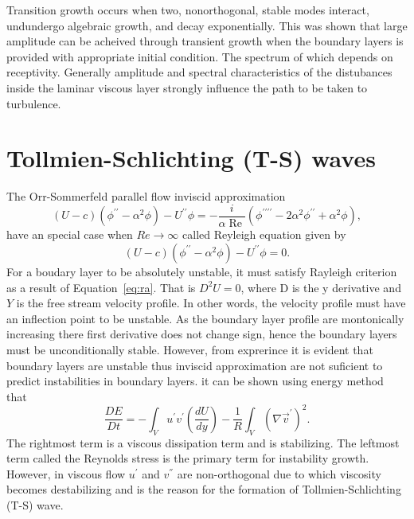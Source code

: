 \documentclass[twoside]{iitbreport}
\newcommand{\Eqref}[1]{Equation~\eqref{eq:#1}}
\begin{document}
Transition growth occurs when two, nonorthogonal, stable modes interact,
undundergo algebraic growth, and decay exponentially. This was shown that
large amplitude can be acheived through transient growth when the boundary
layers is provided with appropriate initial condition. The spectrum of
which depends on receptivity. Generally amplitude and spectral
characteristics of the distubances inside the laminar viscous layer
strongly influence the path to be taken to turbulence.

\section{Tollmien-Schlichting (T-S) waves}

The Orr-Sommerfeld parallel flow inviscid approximation
\begin{equation}
  (U-c)\left(\phi^{\prime \prime}-\alpha^{2} \phi\right)-U^{\prime \prime}
  \phi=-\frac{i}{\alpha \operatorname{Re}}\left(\phi^{\prime \prime \prime
  \prime}-2 \alpha^{2} \phi^{\prime \prime}+\alpha^{2} \phi\right),
  \label{eq:os}
\end{equation}
have an special case when $Re \to \infty$ called Reyleigh equation given by
\begin{equation}
 (U-c)\left(\phi^{\prime \prime}-\alpha^{2} \phi\right)-U^{\prime \prime}
 \phi=0. 
  \label{eq:ra}
\end{equation}
For a boudary layer to be absolutely unstable, it must satisfy Rayleigh
criterion as a result of \Eqref{ra}. That is $D^2U = 0$, where D is the y
derivative and $Y$ is the free stream velocity profile. In other words, the
velocity profile must have an inflection point to be unstable. As the
boundary  layer profile are montonically increasing there first derivative
does not change sign, hence the boundary layers must be unconditionally
stable. However, from exprerince it is evident that boundary layers are
unstable thus inviscid approximation are not suficient to predict
instabilities in boundary layers. it can be shown using energy method that
\begin{equation}
 \frac{D E}{D t}=-\int_{V} u^{\prime} v^{\prime}\left(\frac{d U}{d
 y}\right)-\frac{1}{R} \int_{V}\left(\nabla \vec{v}^{\prime}\right)^{2}. 
  \label{eq:energy}
\end{equation}
The rightmost term is a viscous dissipation term and is stabilizing. The
leftmost term called the Reynolds stress is the primary term for instability
growth. However, in viscous flow $u^{'}$ and $v^{''}$ are non-orthogonal
due to which viscosity becomes destabilizing and is the reason for the
formation of Tollmien-Schlichting (T-S) wave.
\end{document}
